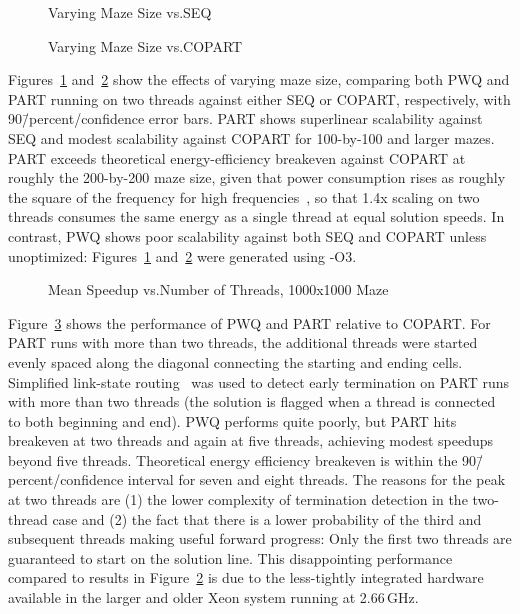 \begin{figure}
\centering
{}
\caption{Varying Maze Size vs.\@ SEQ}
\label{fig:SMPdesign:Varying Maze Size vs. SEQ}
\end{figure}

\begin{figure}
\centering
{}
\caption{Varying Maze Size vs.\@ COPART}
\label{fig:SMPdesign:Varying Maze Size vs. COPART}
\end{figure}

Figures~\ref{fig:SMPdesign:Varying Maze Size vs. SEQ}
and~\ref{fig:SMPdesign:Varying Maze Size vs. COPART}
show the effects of varying maze size, comparing both PWQ and PART
running on two threads
against either SEQ or COPART, respectively, with 90\=/percent\-/confidence
error bars.
PART shows superlinear scalability against SEQ and modest scalability
against COPART for 100-by-100 and larger mazes.
PART exceeds theoretical energy-efficiency breakeven against COPART at roughly
the 200-by-200 maze size, given that power consumption rises as roughly
the square of the frequency for high frequencies~\cite{TrevorMudge2000Power},
so that 1.4x scaling on two threads consumes the same energy
as a single thread at equal solution speeds.
In contrast, PWQ shows poor scalability against both SEQ and COPART
unless unoptimized: Figures~\ref{fig:SMPdesign:Varying Maze Size vs. SEQ} 
and~\ref{fig:SMPdesign:Varying Maze Size vs. COPART}
were generated using -O3.

\begin{figure}
\centering
{}
\caption{Mean Speedup vs.\@ Number of Threads, 1000x1000 Maze}
\label{fig:SMPdesign:Mean Speedup vs. Number of Threads, 1000x1000 Maze}
\end{figure}

Figure~\ref{fig:SMPdesign:Mean Speedup vs. Number of Threads, 1000x1000 Maze}
shows the performance of PWQ and PART relative to COPART\@.
For PART runs with more than two threads, the additional threads were
started evenly spaced along the diagonal connecting the starting and
ending cells.
Simplified link-state routing~\cite{BERT-87} was used to
detect early termination on PART runs with more than two threads
(the solution is flagged when
a thread is connected to both beginning and end).
PWQ performs quite poorly, but
PART hits breakeven at two threads and again at five threads, achieving
modest speedups beyond five threads.
Theoretical energy efficiency breakeven is within the 90\=/percent\-/confidence
interval for seven and eight threads.
The reasons for the peak at two threads are (1) the lower complexity
of termination detection in the two-thread case and (2) the fact that
there is a lower probability of the third and subsequent threads making
useful forward progress: Only the first two threads are guaranteed to start on
the solution line.
This disappointing performance compared to results in
Figure~\ref{fig:SMPdesign:Varying Maze Size vs. COPART}
is due to the less-tightly integrated hardware available in the
larger and older Xeon system running at 2.66\,GHz.


